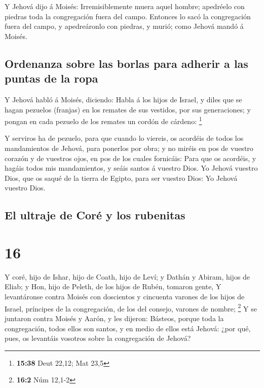  Y Jehová dijo á Moisés: Irremisiblemente muera aquel
hombre; apedréelo con piedras toda la congregación fuera del campo.
 Entonces lo sacó la congregación fuera del campo, y
apedreáronlo con piedras, y murió; como Jehová mandó á Moisés.

\hypertarget{ordenanza-sobre-las-borlas-para-adherir-a-las-puntas-de-la-ropa}{%
\subsection{Ordenanza sobre las borlas para adherir a las puntas de la
ropa}\label{ordenanza-sobre-las-borlas-para-adherir-a-las-puntas-de-la-ropa}}

 Y Jehová habló á Moisés, diciendo:  Habla á
los hijos de Israel, y diles que se hagan pezuelos (franjas) en los
remates de sus vestidos, por sus generaciones; y pongan en cada pezuelo
de los remates un cordón de cárdeno: \footnote{\textbf{15:38} Deut
  22,12; Mat 23,5}

 Y serviros ha de pezuelo, para que cuando lo viereis, os
acordéis de todos los mandamientos de Jehová, para ponerlos por obra; y
no miréis en pos de vuestro corazón y de vuestros ojos, en pos de los
cuales fornicáis:  Para que os acordéis, y hagáis todos mis
mandamientos, y seáis santos á vuestro Dios.  Yo Jehová
vuestro Dios, que os saqué de la tierra de Egipto, para ser vuestro
Dios: Yo Jehová vuestro Dios.

\hypertarget{el-ultraje-de-coruxe9-y-los-rubenitas}{%
\subsection{El ultraje de Coré y los
rubenitas}\label{el-ultraje-de-coruxe9-y-los-rubenitas}}

\hypertarget{section-15}{%
\section{16}\label{section-15}}

 Y coré, hijo de Ishar, hijo de Coath, hijo de Leví; y
Dathán y Abiram, hijos de Eliab; y Hon, hijo de Peleth, de los hijos de
Rubén, tomaron gente,  Y levantáronse contra Moisés con
doscientos y cincuenta varones de los hijos de Israel, príncipes de la
congregación, de los del consejo, varones de nombre; \footnote{\textbf{16:2}
  Núm 12,1-2}  Y se juntaron contra Moisés y Aarón, y les
dijeron: Básteos, porque toda la congregación, todos ellos son santos, y
en medio de ellos está Jehová: ¿por qué, pues, os levantáis vosotros
sobre la congregación de Jehová?


